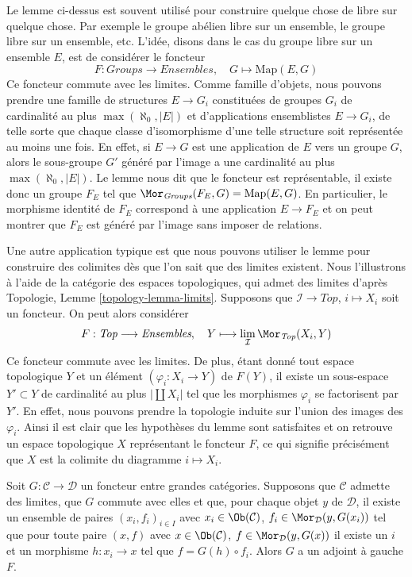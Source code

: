 \begin{remark}
\label{remark-how-to-use-it}
Le lemme ci-dessus est souvent utilisé pour construire quelque chose de libre
sur quelque chose. Par exemple le groupe abélien libre sur un ensemble, le
groupe libre sur un ensemble, etc. L'idée, disons dans le cas du groupe libre
sur un ensemble $E$, est de considérer le foncteur
$$
F : \textit{Groups} \to \textit{Ensembles},\quad
G \longmapsto \text{Map}(E, G)
$$
Ce foncteur commute avec les limites. Comme famille d'objets, nous pouvons
prendre une famille de structures $E \to G_i$ constituées de groupes $G_i$
de cardinalité au plus $\max(\aleph_0, |E|)$ et d'applications ensemblistes
$E \to G_i$, de telle sorte que chaque classe d'isomorphisme d'une telle
structure soit représentée
au moins une fois. En effet, si $E \to G$ est une application de $E$ vers un
groupe $G$, alors le sous-groupe $G'$ généré par l'image a une cardinalité au
plus $\max(\aleph_0, |E|)$. Le lemme nous dit que le foncteur est
représentable, il existe donc un groupe $F_E$ tel que
$\Mor_{\textit{Groups}}(F_E, G) = \text{Map}(E, G)$. En particulier, le
morphisme identité de $F_E$ correspond à une application $E \to F_E$ et on
peut montrer que $F_E$ est généré par l'image sans imposer de relations.

\medskip\noindent
Une autre application typique est que nous pouvons utiliser le lemme pour
construire des colimites dès que l'on sait que des limites existent. Nous
l'illustrons à l'aide de la catégorie des espaces topologiques, qui admet des
limites d'après Topologie, Lemme \ref{topology-lemma-limits}. Supposons
que $\mathcal{I} \to \textit{Top}$, $i \mapsto X_i$ soit un foncteur. On peut
alors considérer
$$
F : \textit{Top} \longrightarrow \textit{Ensembles},\quad
Y \longmapsto \lim_\mathcal{I} \Mor_{\textit{Top}}(X_i, Y)
$$
Ce foncteur commute avec les limites. De plus, étant donné tout espace
topologique $Y$ et un élément $(\varphi_i : X_i \to Y)$ de $F(Y)$, il existe
un sous-espace $Y' \subset Y$ de cardinalité au plus $|\coprod X_i|$ tel que
les morphismes $\varphi_i$ se factorisent par $Y'$. En effet, nous pouvons prendre
la topologie induite sur l'union des images des $\varphi_i$. Ainsi il est clair
que les hypothèses du lemme sont satisfaites et on retrouve un espace
topologique $X$ représentant le foncteur $F$, ce qui signifie précisément que
$X$ est la colimite du diagramme $i \mapsto X_i$.
\end{remark}

\begin{theorem}
\label{theorem-adjoint-functor}
Soit $G : \mathcal{C} \to \mathcal{D}$ un foncteur entre grandes catégories.
Supposons que $\mathcal{C}$ admette des limites, que $G$ commute avec elles et que,
pour chaque objet $y$ de $\mathcal{D}$, il existe un ensemble de paires $(x_i, f_i)_{i \in I}$ avec $x_i \in \Ob(\mathcal{C})$, $f_i \in \Mor_\mathcal{D}(y, G(x_i))$ tel que pour toute paire $(x, f)$ avec $x \in \Ob(\mathcal{C})$, $f \in \Mor_\mathcal{D}(y, G(x))$ il existe un $i$ et un morphisme $h : x_i \to x$ tel que $f = G(h) \circ f_i$. Alors $G$ a un adjoint à gauche $F$.
\end{theorem}

